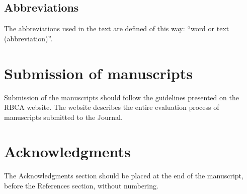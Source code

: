 \documentclass[alpha-refs,english]{RBCA_v3.0}
\begin{document}
\subsection{Abbreviations}
The abbreviations used in the text are defined of this way: ``word or text (abbreviation)''.


\section{Submission of manuscripts}
Submission of the manuscripts should follow the guidelines presented on the RBCA website. The website describes the entire evaluation process of manuscripts submitted to the Journal.

\section*{Acknowledgments}

The Acknowledgments section should be placed at the end of the manuscript, before the References section, without numbering.

 
\end{document}
